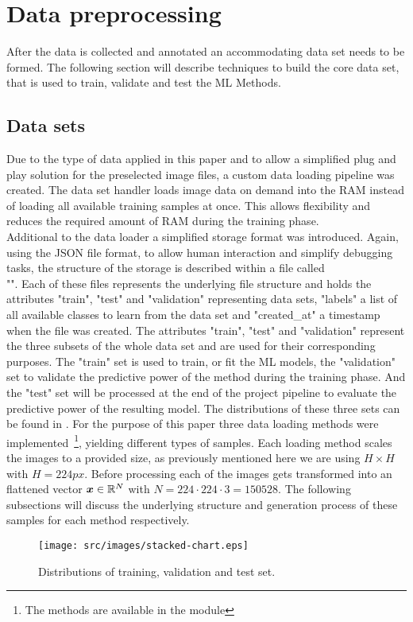 \section{Data preprocessing}\label{sec:data-preprocessing}
After the data is collected and annotated an accommodating data set needs to be formed.
The following section will describe techniques to build the core data set, that is used to train, validate and test the ML Methods.
\subsection{Data sets}\label{subsec:datasets}
Due to the type of data applied in this paper and to allow a simplified plug and play solution for the preselected image files, a custom data loading pipeline was created.
The data set handler loads image data on demand into the RAM instead of loading all available training samples at once.
This allows flexibility and reduces the required amount of RAM during the training phase.\\
Additional to the data loader a simplified storage format was introduced.
Again, using the JSON file format, to allow human interaction and simplify debugging tasks, the structure of the storage is described within a file called\\ "".
Each of these files represents the underlying file structure and holds the attributes "train", "test" and "validation" representing data sets, "labels" a list of all available classes to learn from the data set and "created\_at" a timestamp when the file was created.
The attributes "train", "test" and "validation" represent the three subsets of the whole data set and are used for their corresponding purposes.
The "train" set is used to train, or fit the ML models, the "validation" set to validate the predictive power of the method during the training phase.
And the "test" set will be processed at the end of the project pipeline to evaluate the predictive power of the resulting model.
The distributions of these three sets can be found in .
For the purpose of this paper three data loading methods were implemented~\footnote{The methods are available in the module }, yielding different types of samples.
Each loading method scales the images to a provided size, as previously mentioned here we are using $H\times H$ with $H=224px$.
Before processing each of the images gets transformed into an flattened vector $\bm{x}\in\mathbb{R}^N$ with $N=224\cdot 224\cdot3 = 150528$.
The following subsections will discuss the underlying structure and generation process of these samples for each method respectively.
\begin{figure}[!ht]
    \centering
    \texttt{[image: src/images/stacked-chart.eps]}
    \caption{Distributions of training, validation and test set.}
    \label{fig:set-distributions}
\end{figure}


